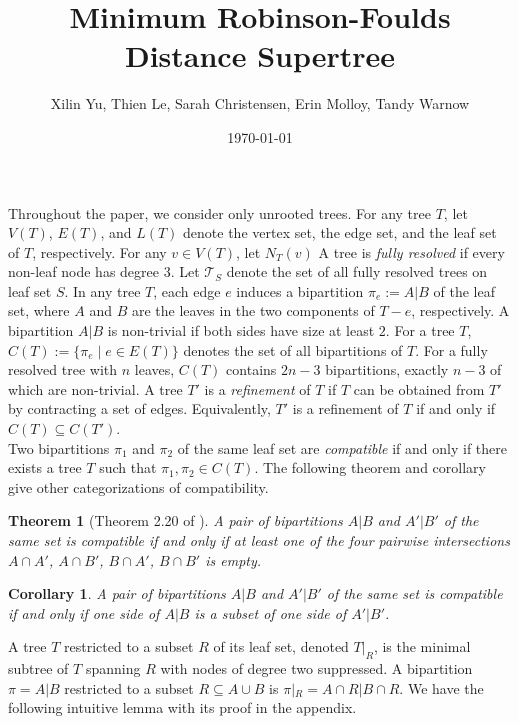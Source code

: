 \documentclass{article}
\title{Minimum Robinson-Foulds Distance Supertree}
\author{Xilin Yu, Thien Le, Sarah Christensen,  Erin Molloy, Tandy Warnow}
\date{\today}
\newtheorem{theorem}{Theorem}
\newtheorem{corollary}{Corollary}
\begin{document}
\maketitle

Throughout the paper, we consider only unrooted trees. For any tree $T$, let $V(T)$, $E(T)$, and $L(T)$ denote the vertex set, the edge set, and the leaf set of $T$, respectively. For any $v\in V(T)$, let $N_T(v)$  A tree is \textit{fully resolved} if every non-leaf node has degree $3$. Let $\mathcal{T}_S$ denote the set of all fully resolved trees on leaf set $S$. In any tree $T$, each edge $e$ induces a bipartition $\pi_e := A|B$ of the leaf set, where $A$ and $B$ are the leaves in the two components of $T-e$, respectively. A bipartition $A|B$ is non-trivial if both sides have size at least $2$. For a tree $T$, $C(T) := \{\pi_e \mid e\in E(T)\}$ denotes the set of all bipartitions of $T$. For a fully resolved tree with $n$ leaves, $C(T)$ contains $2n-3$ bipartitions, exactly $n-3$ of which are non-trivial. A tree $T'$ is a \textit{refinement} of $T$ if $T$ can be obtained from $T'$ by contracting a set of edges. Equivalently, $T'$ is a refinement of $T$ if and only if $C(T) \subseteq C(T')$.\\

Two bipartitions $\pi_1$ and $\pi_2$ of the same leaf set are \textit{compatible} if and only if there exists a tree $T$ such that $\pi_1, \pi_2 \in C(T)$. The following theorem and corollary give other categorizations of compatibility.

\begin{theorem}[Theorem 2.20 of \cite{warnow2017computational}]\label{thm:compatibility}
    A pair of bipartitions $A|B$ and $A'|B'$ of the same set is compatible if and only if at least one of the four pairwise intersections $A \cap A'$, $A\cap B'$, $B\cap A'$, $B \cap B'$ is empty. 
\end{theorem}

\begin{corollary}\label{cor:compatibility}
     A pair of bipartitions $A|B$ and $A'|B'$ of the same set is compatible if and only if one side of $A|B$ is a subset of one side of $A'|B'$.
\end{corollary}

A tree $T$ restricted to a subset $R$ of its leaf set, denoted $T|_R$, is the minimal subtree of $T$ spanning $R$ with nodes of degree two suppressed. A bipartition $\pi = A|B$ restricted to a subset $R \subseteq A\cup B$ is $\pi|_R = A\cap R | B\cap R$. We have the following intuitive lemma with its proof in the appendix.
\end{document}
